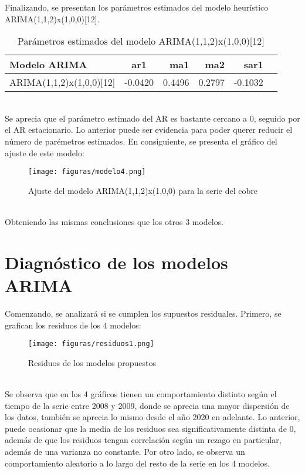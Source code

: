 \documentclass{report}
\begin{document}
Finalizando, se presentan los parámetros estimados del modelo heurístico ARIMA(1,1,2)x(1,0,0)[12].\\
\begin{table}[h!]
  \begin{center}
    \label{tab:table1}
    \begin{tabular}{|l|c|r|r|r|r|} 
      \hline
      \textbf{Modelo ARIMA} & ar1 & ma1 & ma2 & sar1 \\
      \hline
      ARIMA(1,1,2)x(1,0,0)[12] & -0.0420 & 0.4496  & 0.2797 & -0.1032 \\
      \hline
    \end{tabular}
  \end{center}
  \caption{Parámetros estimados del modelo ARIMA(1,1,2)x(1,0,0)[12]}
\end{table}\\

Se aprecia que el parámetro estimado del AR es bastante cercano a 0, seguido por el AR estacionario. Lo anterior puede ser evidencia para poder querer reducir el número de parémetros estimados. En consiguiente, se presenta el gráfico del ajuste de este modelo:\\
\vspace{5cm}

    \begin{figure}[htp]
        \centering
    	\texttt{[image: figuras/modelo4.png]}
    	\caption{Ajuste del modelo ARIMA(1,1,2)x(1,0,0) para la serie del cobre}
    	\label{fig: Figura1}
    \end{figure}\\
Obteniendo las mismas conclusiones que los otros 3 modelos.\\



\newpage
\section{Diagnóstico de los modelos ARIMA}\label{Diagnóstico}
Comenzando, se analizará si se cumplen los supuestos residuales. Primero, se grafican los residuos de los 4 modelos:\\
\begin{figure}[htp]
        \centering
    	\texttt{[image: figuras/residuos1.png]}
    	\caption{Residuos de los modelos propuestos}
    	\label{fig: Figura1}
\end{figure}\\

Se observa que en los 4 gráficos tienen un comportamiento distinto según el tiempo de la serie entre 2008 y 2009, donde se aprecia una mayor dispersión de los datos, también se aprecia lo mismo desde el año 2020 en adelante. Lo anterior, puede ocasionar que la media de los residuos sea significativamente distinta de 0, además de que los residuos tengan correlación según un rezago en particular, además de una varianza no constante. Por otro lado, se observa un comportamiento aleatorio a lo largo del resto de la serie en los 4 modelos.\\
\end{document}
